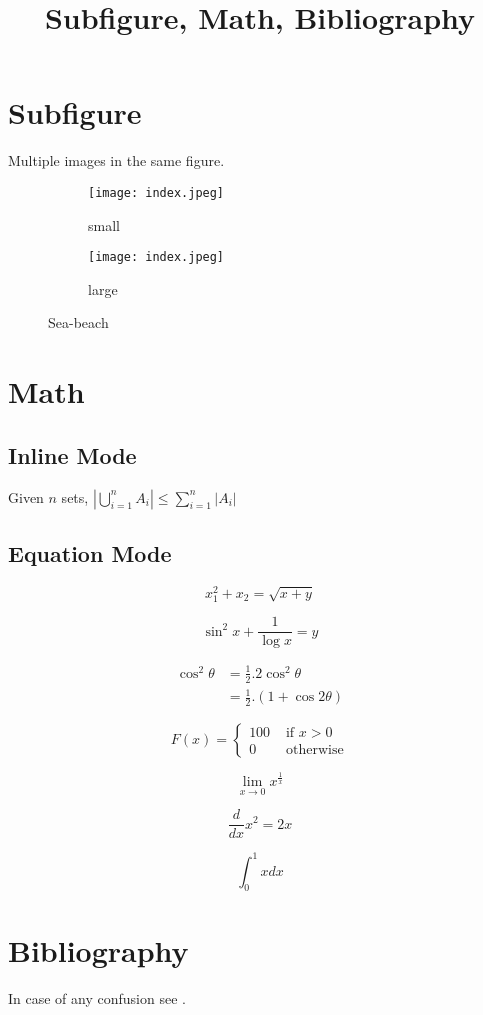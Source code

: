 \documentclass[a4paper, 12pt]{article}
\title{Subfigure, Math, Bibliography}
\begin{document}
\maketitle
\tableofcontents
\listoffigures
\newpage

\section{Subfigure}
Multiple images in the same figure.\\
\begin{figure}[h]
	\centering
	\begin{subfigure}[b]{0.4\textwidth}
		\centering
		\texttt{[image: index.jpeg]}
		\caption{small}
	\end{subfigure}
	\begin{subfigure}[b]{0.5\textwidth}
		\centering
		\texttt{[image: index.jpeg]}
		\caption{large}
	\end{subfigure}
	\caption{Sea-beach}
\end{figure}

\section{Math}
\subsection{Inline Mode}
Given $n$ sets, $|\bigcup\limits_{i=1}^{n} A_i| \leq \sum\limits_{i=1}^{n} |A_i|$
\subsection{Equation Mode}
\begin{equation}
	x_1^2 + x_2 = \sqrt{x+y}
\end{equation}

\begin{equation*}
	\sin^2x + \frac{1}{\log x} = y
\end{equation*}
	
\begin{align*}
	\cos^2\theta & = \frac{1}{2}.2\cos^2\theta\\
	& = \frac{1}{2}.(1+\cos 2\theta)
\end{align*}

\begin{equation}
	F(x) = 
	\begin{cases}
		100 & \text { if } x > 0\\
		0 & \text{ otherwise}
	\end{cases}
\end{equation}

\begin{equation}
	\lim_{x \to 0} x^\frac{1}{x}
\end{equation}

\begin{equation}
	\frac{d}{dx} x^2 = 2x
\end{equation}

\begin{equation}
	\int_0^1 xdx
\end{equation}

\section{Bibliography}
In case of any confusion see \cite{abcd}.



\end{document}
